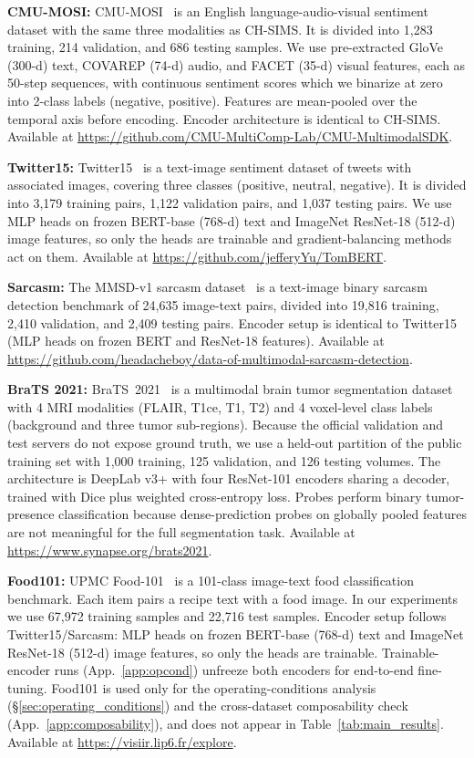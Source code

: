 \documentclass{article}
\begin{document}
\noindent\textbf{CMU-MOSI:} CMU-MOSI~\citep{zadeh2016mosi} is an English language-audio-visual sentiment dataset with the same three modalities as CH-SIMS. It is divided into 1{,}283 training, 214 validation, and 686 testing samples. We use pre-extracted GloVe (300-d) text, COVAREP (74-d) audio, and FACET (35-d) visual features, each as 50-step sequences, with continuous sentiment scores which we binarize at zero into 2-class labels (negative, positive). Features are mean-pooled over the temporal axis before encoding. Encoder architecture is identical to CH-SIMS. Available at \url{https://github.com/CMU-MultiComp-Lab/CMU-MultimodalSDK}.

\noindent\textbf{Twitter15:} Twitter15~\citep{yu2019tombert, zhang2018adaptive} is a text-image sentiment dataset of tweets with associated images, covering three classes (positive, neutral, negative). It is divided into 3{,}179 training pairs, 1{,}122 validation pairs, and 1{,}037 testing pairs. We use MLP heads on frozen BERT-base (768-d) text and ImageNet ResNet-18 (512-d) image features, so only the heads are trainable and gradient-balancing methods act on them. Available at \url{https://github.com/jefferyYu/TomBERT}.

\noindent\textbf{Sarcasm:} The MMSD-v1 sarcasm dataset~\citep{cai2019sarcasm} is a text-image binary sarcasm detection benchmark of 24{,}635 image-text pairs, divided into 19{,}816 training, 2{,}410 validation, and 2{,}409 testing pairs. Encoder setup is identical to Twitter15 (MLP heads on frozen BERT and ResNet-18 features). Available at \url{https://github.com/headacheboy/data-of-multimodal-sarcasm-detection}.

\noindent\textbf{BraTS 2021:} BraTS~2021~\citep{baid2021brats} is a multimodal brain tumor segmentation dataset with 4 MRI modalities (FLAIR, T1ce, T1, T2) and 4 voxel-level class labels (background and three tumor sub-regions). Because the official validation and test servers do not expose ground truth, we use a held-out partition of the public training set with 1{,}000 training, 125 validation, and 126 testing volumes. The architecture is DeepLab v3+ with four ResNet-101 encoders sharing a decoder, trained with Dice plus weighted cross-entropy loss. Probes perform binary tumor-presence classification because dense-prediction probes on globally pooled features are not meaningful for the full segmentation task. Available at \url{https://www.synapse.org/brats2021}.

\noindent\textbf{Food101:} UPMC Food-101~\citep{wang2015upmcfood} is a 101-class image-text food classification benchmark. Each item pairs a recipe text with a food image. In our experiments we use 67{,}972 training samples and 22{,}716 test samples. Encoder setup follows Twitter15/Sarcasm: MLP heads on frozen BERT-base (768-d) text and ImageNet ResNet-18 (512-d) image features, so only the heads are trainable. Trainable-encoder runs (App.~\ref{app:opcond}) unfreeze both encoders for end-to-end fine-tuning. Food101 is used only for the operating-conditions analysis (\S\ref{sec:operating_conditions}) and the cross-dataset composability check (App.~\ref{app:composability}), and does not appear in Table~\ref{tab:main_results}. Available at \url{https://visiir.lip6.fr/explore}.
\end{document}
